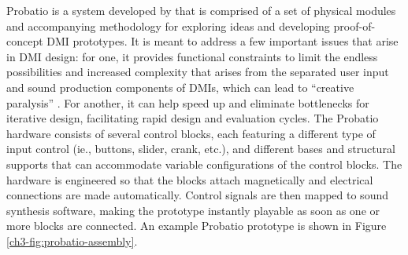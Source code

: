 \documentclass[]{interact}
\theoremstyle{plain}%
\theoremstyle{definition}
\theoremstyle{remark}
\begin{document}
Probatio is a system developed by \citet{Calegario2019} that is comprised of a set of physical modules and accompanying methodology for exploring ideas and developing proof-of-concept DMI prototypes. It is meant to address a few important issues that arise in DMI design: for one, it provides functional constraints to limit the endless possibilities and increased complexity that arises from the separated user input and sound production components of DMIs, which can lead to ``creative paralysis'' \citep{Magnusson2010}. For another, it can help speed up and eliminate bottlenecks for iterative design, facilitating rapid design and evaluation cycles. The Probatio hardware consists of several control blocks, each featuring a different type of input control (ie., buttons, slider, crank, etc.), and different bases and structural supports that can accommodate variable configurations of the control blocks. The hardware is engineered so that the blocks attach magnetically and electrical connections are made automatically. Control signals are then mapped to sound synthesis software, making the prototype instantly playable as soon as one or more blocks are connected. An example Probatio prototype is shown in Figure \ref{ch3-fig:probatio-assembly}.
\end{document}
